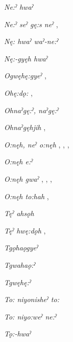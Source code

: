\begin{CayugaRelated}
\item{}\textit{Ne:ˀ hwaˀ} 

\item{}\textit{Ne:ˀ seˀ gę:s neˀ} , 

\item{}\textit{Nę: hwaˀ waˀ-ne:ˀ} 

\item{}\textit{Nę:-gyęh hwaˀ} 

\item{}\textit{Ogwęhę:gyeˀ} , 

\item{}\textit{Ohę:dǫ:} , 

\item{}\textit{Ohnaˀgę:ˀ, naˀgę:ˀ} 

\item{}\textit{Ohnaˀgęhjih} , 

\item{}\textit{O:nęh, neˀ o:nęh} , , , 

\item{}\textit{O:nęh e:ˀ} 

\item{}\textit{O:nęh gwaˀ} , , , 

\item{}\textit{O:nęh to:hah} , 

\item{}\textit{Tęˀ ahsǫh} 

\item{}\textit{Tęˀ hwę:dǫh} , 

\item{}\textit{Tgǫhaǫgyeˀ} 

\item{}\textit{Tgwahaǫ:ˀ} 

\item{}\textit{Tgwęhę:ˀ} 

\item{}\textit{To: niyonisheˀ to:} 

\item{}\textit{To: niyo:weˀ ne:ˀ} 

\item{}\textit{Tǫ:-hwaˀ} 


\end{CayugaRelated}
